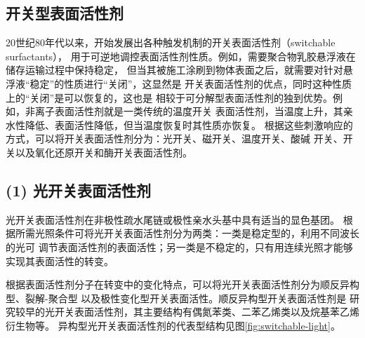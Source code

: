 \documentclass[bachelor,winfonts,replaceperiod]{jnuthesis}
\begin{document}
    
   \subsection{开关型表面活性剂}
    20世纪80年代以来，开始发展出各种触发机制的开关表面活性剂（switchable surfactants），
    用于可逆地调控表面活性剂性质。例如，需要聚合物乳胶悬浮液在储存运输过程中保持稳定，
    但当其被施工涂刷到物体表面之后，就需要对针对悬浮液“稳定”的性质进行“关闭”，这显然是
    开关表面活性剂的优点\cite{jessop2012}，同时这种性质上的“关闭”是可以恢复的，这也是
    相较于可分解型表面活性剂的独到优势。例如，非离子表面活性剂就是一类传统的温度开关
    表面活性剂，当温度上升，其亲水性降低、表面活性降低，但当温度恢复时其性质亦恢复。
    根据这些刺激响应的方式，可以将开关表面活性剂分为：光开关、磁开关、温度开关、酸碱
    开关、开关以及氧化还原开关和酶开关表面活性剂\cite{秦勇2009}。
    
    \subsection*{(1) 光开关表面活性剂}
    光开关表面活性剂在非极性疏水尾链或极性亲水头基中具有适当的显色基团\cite{张冤帝2017}。
    根据所需光照条件可将光开关表面活性剂分为两类：一类是稳定型的，利用不同波长的光可
    调节表面活性剂的表面活性；另一类是不稳定的，只有用连续光照才能够实现其表面活性的转变。
    
    根据表面活性剂分子在转变中的变化特点，可以将光开关表面活性剂分为顺反异构型、裂解-聚合型
    以及极性变化型开关表面活性\cite{张冤帝2017,李云霞2011}。顺反异构型开关表面活性剂是
    研究较早的光开关表面活性剂，其主要结构有偶氮苯类、二苯乙烯类以及烷基苯乙烯衍生物等。
    异构型光开关表面活性剂的代表型结构见图\ref{fig:switchable-light}\cite{张冤帝2017,karthaus1996,shang2003,吕湘亮2018}。
    
\end{document}
